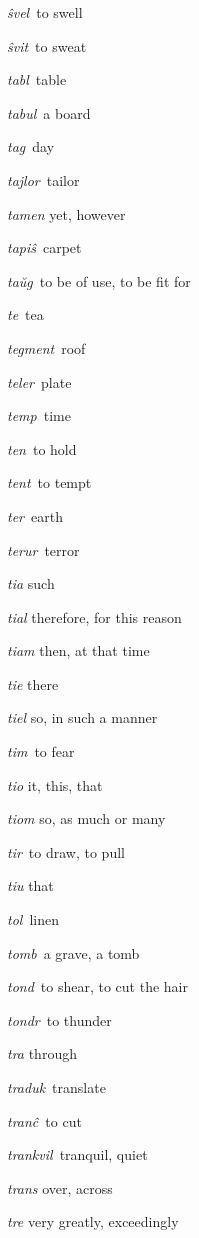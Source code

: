 \begin{landscape}
\begin{multicols}{5}
\begin{outdent}{1em}
\emph{ŝvel\,} to swell

\emph{ŝvit\,} to sweat
\end{outdent}


\begin{outdent}{1em}
\emph{tabl\,} table

\emph{tabul\,} a board

\emph{tag\,} day

\emph{tajlor\,} tailor

\emph{tamen} yet, however

\emph{tapiŝ\,} carpet

\emph{taŭg\,} to be of use, to be fit for

\emph{te\,} tea

\emph{tegment\,} roof

\emph{teler\,} plate

\emph{temp\,} time

\emph{ten\,} to hold

\emph{tent\,} to tempt

\emph{ter\,} earth

\emph{terur\,} terror

\emph{tia} such

\emph{tial} therefore, for this reason

\emph{tiam} then, at that time

\emph{tie} there

\emph{tiel} so, in such a manner

\emph{tim\,} to fear

\emph{tio} it, this, that

\emph{tiom} so, as much or many

\emph{tir\,} to draw, to pull

\emph{tiu} that

\emph{tol\,} linen

\emph{tomb\,} a grave, a tomb

\emph{tond\,} to shear, to cut the hair

\emph{tondr\,} to thunder

\emph{tra} through

\emph{traduk\,} translate

\emph{tranĉ\,} to cut

\emph{trankvil\,} tranquil, quiet

\emph{trans} over, across

\emph{tre} very greatly, exceedingly


\end{outdent}
\end{multicols}
\end{landscape}
